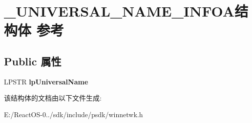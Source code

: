 \hypertarget{struct___u_n_i_v_e_r_s_a_l___n_a_m_e___i_n_f_o_a}{}\section{\+\_\+\+U\+N\+I\+V\+E\+R\+S\+A\+L\+\_\+\+N\+A\+M\+E\+\_\+\+I\+N\+F\+O\+A结构体 参考}
\label{struct___u_n_i_v_e_r_s_a_l___n_a_m_e___i_n_f_o_a}
\subsection*{Public 属性}
\begin{DoxyCompactItemize}
\item 
\mbox{\label{struct___u_n_i_v_e_r_s_a_l___n_a_m_e___i_n_f_o_a_af93e15daadfddf0545aaddfd5dc2176a}} 
L\+P\+S\+TR {\bfseries lp\+Universal\+Name}
\end{DoxyCompactItemize}


该结构体的文档由以下文件生成\+:\begin{DoxyCompactItemize}
\item 
E\+:/\+React\+O\+S-\/0../sdk/include/psdk/winnetwk.\+h\end{DoxyCompactItemize}
